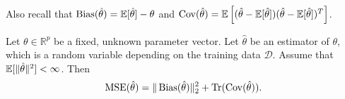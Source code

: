 Also recall that 
$\operatorname{Bias}(\hat{\theta}) = \mathbb{E}[\hat{\theta}] - \theta$ and 
$\operatorname{Cov}(\hat{\theta}) = \mathbb{E}\left[ (\hat{\theta} - \mathbb{E}[\hat{\theta}])(\hat{\theta} - \mathbb{E}[\hat{\theta}])^T \right]$.


\smallskip





\begin{theorem}\label{th:bias_variance}
Let $\theta \in \mathbb{R}^p$ be a fixed, unknown parameter vector. Let $\hat{\theta}$ be an estimator of $\theta$, which is a random variable depending on the training data $\mathcal{D}$. Assume that 
$\mathbb{E} [ \|\hat{\theta}\|^2 ] < \infty$. Then
\begin{equation}\label{eq:bias_variance_param}
\operatorname{MSE}(\hat{\theta}) = \|\operatorname{Bias}(\hat{\theta})\|_2^2 + \operatorname{Tr}(\operatorname{Cov}(\hat{\theta})).
\end{equation}

\end{theorem}



